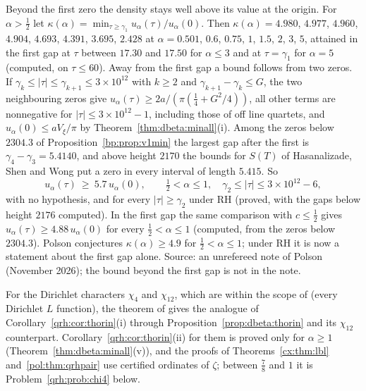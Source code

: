 \begin{remark}
Beyond the first zero the density stays well above its value at the origin. For $\alpha>\frac12$ let $\kappa(\alpha)=\min_{\tau\ge\gamma_1}u_\alpha(\tau)/u_\alpha(0)$. Then $\kappa(\alpha)=4.980$, $4.977$, $4.960$, $4.904$, $4.693$, $4.391$, $3.695$, $2.428$ at $\alpha=0.501$, $0.6$, $0.75$, $1$, $1.5$, $2$, $3$, $5$, attained in the first gap at $\tau$ between $17.30$ and $17.50$ for $\alpha\le3$ and at $\tau=\gamma_1$ for $\alpha=5$ (computed, on $\tau\le60$). Away from the first gap a bound follows from two zeros. If $\gamma_k\le|\tau|\le\gamma_{k+1}\le3\times10^{12}$ with $k\ge2$ and $\gamma_{k+1}-\gamma_k\le G$, the two neighbouring zeros give $u_\alpha(\tau)\ge2a/(\pi(\frac14+G^2/4))$, all other terms are nonnegative for $|\tau|\le3\times10^{12}-1$, including those of off line quartets, and $u_\alpha(0)\le aV_\xi/\pi$ by Theorem~\ref{thm:dbeta:minall}(i). Among the zeros below $2304.3$ of Proposition~\ref{bp:prop:v1min} the largest gap after the first is $\gamma_4-\gamma_3=5.4140$, and above height $2170$ the bounds for $S(T)$ of Hasanalizade, Shen and Wong \cite{HSW22} put a zero in every interval of length $5.415$. So
\[
u_\alpha(\tau)\ \ge\ 5.7\,u_\alpha(0),\qquad\tfrac12<\alpha\le1,\quad\gamma_2\le|\tau|\le3\times10^{12}-6,
\]
with no hypothesis, and for every $|\tau|\ge\gamma_2$ under RH (proved, with the gaps below height $2176$ computed). In the first gap the same comparison with $c\le\frac12$ gives $u_\alpha(\tau)\ge4.88\,u_\alpha(0)$ for every $\frac12<\alpha\le1$ (computed, from the zeros below $2304.3$). Polson conjectures $\kappa(\alpha)\ge4.9$ for $\frac12<\alpha\le1$; under RH it is now a statement about the first gap alone. Source: an unrefereed note of Polson (November 2026); the bound beyond the first gap is not in the note.
\end{remark}

For the Dirichlet characters $\chi_4$ and $\chi_{12}$, which are within the scope of \cite{OAI26a} (every Dirichlet $L$ function), the theorem of \cite{OAI26a} gives the analogue of Corollary~\ref{qrh:cor:thorin}(i) through Proposition~\ref{prop:dbeta:thorin} and its $\chi_{12}$ counterpart. Corollary~\ref{qrh:cor:thorin}(ii) for them is proved only for $\alpha\ge1$ (Theorem~\ref{thm:dbeta:minall}(v)), and the proofs of Theorems~\ref{cx:thm:lbl} and~\ref{pol:thm:qrhpair} use certified ordinates of $\zeta$; between $\frac78$ and $1$ it is Problem~\ref{qrh:prob:chi4} below.
